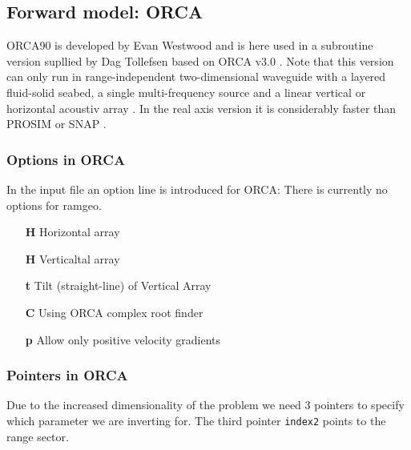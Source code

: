 \documentclass{saclantc}
\begin{document}
\subsection{Forward model: ORCA }

{\sf ORCA90} \cite{levinson:asa95,westwood:asa96}  is developed by
Evan Westwood and is here used in a subroutine version supllied by Dag
Tollefsen \cite{tollefsen02} based on ORCA v3.0 \cite{westwood03}. 
Note that this version can only run in range-independent
two-dimensional waveguide with a layered fluid-solid seabed, a single
multi-frequency source and a linear vertical or horizontal acoustiv array \cite{tollefsen02}.
In the real axis version it is
considerably faster than {\sf PROSIM } or {\sf SNAP }.


\subsubsection{Options in ORCA}
In the input file an option line is introduced for {\sf ORCA}:
There is currently no options for ramgeo.
\begin{itemize}
 \item[\bf H]  Horizontal array
 \item[\bf H]  Verticaltal array
 \item[\bf t]  Tilt (straight-line) of Vertical Array
 \item[\bf C]  Using ORCA complex root finder
 \item[\bf p]   Allow only positive velocity gradients

\end{itemize}


\subsubsection{Pointers in ORCA}
\label{se:orcaopoint}
Due to the increased dimensionality of the problem we need 3 pointers to specify
which parameter we are inverting for. The third pointer {\tt index2} points to the range sector.
\end{document}
